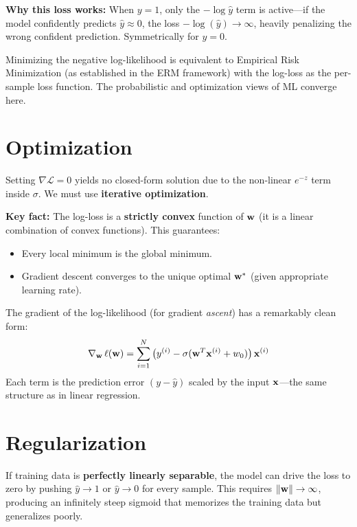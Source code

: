 \textbf{Why this loss works:} When $y=1$, only the $-\log\hat{y}$ term is active---if the model confidently predicts $\hat{y} \approx 0$, the loss $-\log(\hat{y}) \to \infty$, heavily penalizing the wrong confident prediction. Symmetrically for $y=0$.

\begin{remark}
Minimizing the negative log-likelihood is equivalent to Empirical Risk Minimization (as established in the ERM framework) with the log-loss as the per-sample loss function. The probabilistic and optimization views of ML converge here.
\end{remark}

\section*{Optimization}

Setting $\nabla \mathcal{L} = 0$ yields no closed-form solution due to the non-linear $e^{-z}$ term inside $\sigma$. We must use \textbf{iterative optimization}.

\textbf{Key fact:} The log-loss is a \textbf{strictly convex} function of $\mathbf{w}$ (it is a linear combination of convex functions). This guarantees:
\begin{itemize}
    \item Every local minimum is the global minimum.
    \item Gradient descent converges to the unique optimal $\mathbf{w}^*$ (given appropriate learning rate).
\end{itemize}

The gradient of the log-likelihood (for gradient \textit{ascent}) has a remarkably clean form:
$$\nabla_{\mathbf{w}}\,\ell(\mathbf{w}) = \sum_{i=1}^{N}\big(y^{(i)} - \sigma(\mathbf{w}^T\mathbf{x}^{(i)} + w_0)\big)\,\mathbf{x}^{(i)}$$
Each term is the prediction error $(y - \hat{y})$ scaled by the input $\mathbf{x}$---the same structure as in linear regression.

\section*{Regularization}

\begin{remark}
If training data is \textbf{perfectly linearly separable}, the model can drive the loss to zero by pushing $\hat{y} \to 1$ or $\hat{y} \to 0$ for every sample. This requires $\|\mathbf{w}\| \to \infty$, producing an infinitely steep sigmoid that memorizes the training data but generalizes poorly.
\end{remark}

